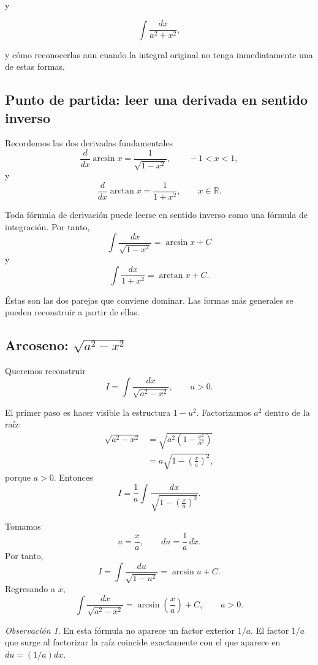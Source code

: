 \documentclass[12pt]{article}
\theoremstyle{definition}
\theoremstyle{remark}
\newtheorem*{observacion}{Observación}
\begin{document}
y

\[
\int\frac{dx}{a^2+x^2},
\]

y cómo reconocerlas aun cuando la integral original no tenga
inmediatamente una de estas formas.
\subsection*{Punto de partida: leer una derivada en sentido inverso}

Recordemos las dos derivadas fundamentales
\[
\frac{d}{dx}\arcsin x=\frac{1}{\sqrt{1-x^2}},
\qquad -1<x<1,
\]
y
\[
\frac{d}{dx}\arctan x=\frac{1}{1+x^2},
\qquad x\in\mathbb{R}.
\]

Toda fórmula de derivación puede leerse en sentido inverso como una fórmula
de integración. Por tanto,
\[
\boxed{\int\frac{dx}{\sqrt{1-x^2}}=\arcsin x+C}
\]
y
\[
\boxed{\int\frac{dx}{1+x^2}=\arctan x+C.}
\]

Éstas son las dos parejas que conviene dominar. Las formas más generales se
pueden reconstruir a partir de ellas.

\subsection*{Arcoseno: \texorpdfstring{$\sqrt{a^2-x^2}$}{sqrt(a2-x2)}}

Queremos reconstruir
\[
I=\int\frac{dx}{\sqrt{a^2-x^2}},\qquad a>0.
\]

El primer paso es hacer visible la estructura $1-u^2$. Factorizamos $a^2$
dentro de la raíz:
\begin{align*}
\sqrt{a^2-x^2}
&=\sqrt{a^2\left(1-\frac{x^2}{a^2}\right)}\\
&=a\sqrt{1-\left(\frac{x}{a}\right)^2},
\end{align*}
porque $a>0$. Entonces
\[
I=\frac1a\int
\frac{dx}{\sqrt{1-\left(\frac{x}{a}\right)^2}}.
\]

Tomamos
\[
u=\frac{x}{a},\qquad du=\frac1a\,dx.
\]
Por tanto,
\[
I=\int\frac{du}{\sqrt{1-u^2}}
=\arcsin u+C.
\]
Regresando a $x$,
\[
\boxed{\int\frac{dx}{\sqrt{a^2-x^2}}
=\arcsin\left(\frac{x}{a}\right)+C,\qquad a>0.}
\]

\begin{observacion}
En esta fórmula no aparece un factor exterior $1/a$. El factor $1/a$ que
surge al factorizar la raíz coincide exactamente con el que aparece en
$du=(1/a)dx$.
\end{observacion}
\end{document}
